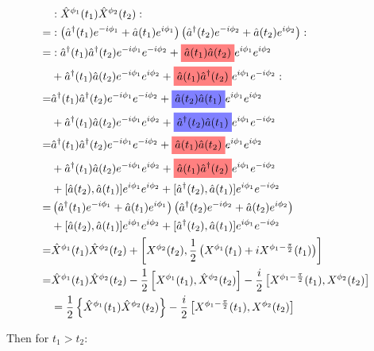 \documentclass[12pt]{article}
\newcommand{\highlightr}[1]{%
  \colorbox{red!50}{$\displaystyle#1$}}
\newcommand{\highlightb}[1]{%
  \colorbox{blue!50}{$\displaystyle#1$}}
\begin{document}
\begin{align}
&:\hat{X}^{\phi_1}(t_1)\hat{X}^{\phi_2}(t_2):\\
=&:\left(\hat{a}^{\dag}(t_1)e^{-i\phi_1} + \hat{a}(t_1)e^{i \phi_1} \right)\left(\hat{a}^{\dag}(t_2)e^{-i\phi_2} + \hat{a}(t_2)e^{i \phi_2} \right) :\\
=&:\hat{a}^{\dag}(t_1)\hat{a}^{\dag}(t_2)e^{-i\phi_1}e^{-i\phi_2} + \highlightr{\hat{a}(t_1)\hat{a}(t_2)}e^{i\phi_1}e^{i\phi_2}\\
&+ \hat{a}^{\dag}(t_1)\hat{a}(t_2)e^{-i\phi_1}e^{i\phi_2} + \highlightr{\hat{a}(t_1)\hat{a}^{\dag}(t_2)}e^{i\phi_1}e^{-i\phi_2} :\\
=&\hat{a}^{\dag}(t_1)\hat{a}^{\dag}(t_2)e^{-i\phi_1}e^{-i\phi_2} + \highlightb{\hat{a}(t_2)\hat{a}(t_1)}e^{i\phi_1}e^{i\phi_2}\\
&+ \hat{a}^{\dag}(t_1)\hat{a}(t_2)e^{-i\phi_1}e^{i\phi_2} + \highlightb{\hat{a}^{\dag}(t_2)\hat{a}(t_1)}e^{i\phi_1}e^{-i\phi_2} \\
=&\hat{a}^{\dag}(t_1)\hat{a}^{\dag}(t_2)e^{-i\phi_1}e^{-i\phi_2} + \highlightr{\hat{a}(t_1)\hat{a}(t_2)}e^{i\phi_1}e^{i\phi_2}\\
&+ \hat{a}^{\dag}(t_1)\hat{a}(t_2)e^{-i\phi_1}e^{i\phi_2} + \highlightr{\hat{a}(t_1)\hat{a}^{\dag}(t_2)}e^{i\phi_1}e^{-i\phi_2} \\
&+ [\hat{a}(t_2),\hat{a}(t_1)] e^{i\phi_1}e^{i\phi_2} + [\hat{a}^{\dag}(t_2),\hat{a}(t_1)]e^{i\phi_1}e^{-i\phi_2}\\
=& \left(\hat{a}^{\dag}(t_1)e^{-i\phi_1} + \hat{a}(t_1)e^{i \phi_1} \right)\left(\hat{a}^{\dag}(t_2)e^{-i\phi_2} + \hat{a}(t_2)e^{i \phi_2} \right)\\
&+ [\hat{a}(t_2),\hat{a}(t_1)] e^{i\phi_1}e^{i\phi_2} + [\hat{a}^{\dag}(t_2),\hat{a}(t_1)]e^{i\phi_1}e^{-i\phi_2}\\
=& \hat{X}^{\phi_1}(t_1)\hat{X}^{\phi_2}(t_2) + \left[X^{\phi_2}(t_2),\frac{1}{2}\left(X^{\phi_1}(t_1)+iX^{\phi_1-\frac{\pi}{2}}(t_1) \right)\right]\\
=& \hat{X}^{\phi_1}(t_1)\hat{X}^{\phi_2}(t_2) - \frac{1}{2}\left[X^{\phi_1}(t_1),\hat{X}^{\phi_2}(t_2) \right] - \frac{i}{2}\left[X^{\phi_1-\frac{\pi}{2}}(t_1),X^{\phi_2}(t_2)\right]\\
&= \frac{1}{2}\left\{\hat{X}^{\phi_1}(t_1)\hat{X}^{\phi_2}(t_2)\right\} - \frac{i}{2}\left[X^{\phi_1-\frac{\pi}{2}}(t_1),X^{\phi_2}(t_2)\right]
\end{align}

Then for $t_1>t_2$:
\end{document}
